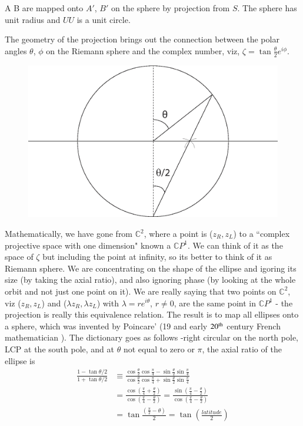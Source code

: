 A B are mapped onto $A'$, $B'$ on the sphere by projection from $S$. The sphere
has unit radius and $U U$ is a unit circle.


The geometry of the projection brings out the connection between the polar
angles $\theta$, $\phi$ on the Riemann sphere and the complex number, viz, $\zeta = \tan \frac{\theta}{2} e^{i\phi}$.
\medskip

\begin{figure}[H]
\centering
\includegraphics[scale=0.2]{src/images/chap26/5.jpg}
\end{figure}
\bigskip

Mathematically, we have gone from $\mathbb{C}^2$, where a point is ($z_R , z_L$) to a ``complex projective space with one dimension" known a $\mathbb{C}P^1$. We can think of it
as the space of $\zeta$ but including the point at infinity, so its better to think of it
as Riemann sphere. We are concentrating on the shape of the ellipse and
igoring its size (by taking the axial ratio), and also ignoring phase (by looking
at the whole orbit and not just one point on it). We are really saying that two
points on $\mathbb{C}^2$, viz ($z_R , z_L$) and ($\lambda z_R , \lambda z_L$) with $\lambda = re^{i\theta}$, $r\neq 0$, are the same
point in $\mathbb{C}P^1$ - the projection is really this equivalence relation. The result is to
map all ellipses onto a sphere, which was invented by Poincare' (19 and early
$20^{\rm th}$ century French mathematician ). The dictionary goes as follows -right circular on the north pole, LCP at the south pole, and at $\theta$ not equal to zero or
$\pi$, the axial ratio of the ellipse is
\begin{align*}
\frac{1-\tan \theta /2}{1+ \tan \theta /2} & \equiv \frac{\cos \frac{\theta}{2} \cos \frac{\pi}{4} - \sin \frac{\theta}{2} \sin \frac{\pi}{4}}{\cos \frac{\theta}{2} \cos \frac{\pi}{4} + \sin \frac{\theta}{2} \sin \frac{\pi}{4}}\\
& = \frac{\cos (\frac{\pi}{4} + \frac{\theta}{2})}{\cos (\frac{\pi}{4} - \frac{\theta}{2})} = \frac{\sin (\frac{\pi}{4} -\frac{\theta}{2})}{\cos (\frac{\pi}{4} - \frac{\theta }{2})}\\
& = \tan \frac{(\frac{\pi}{2} -\theta)}{2} = \tan \left(\frac{latitude}{2} \right)
\end{align*}

